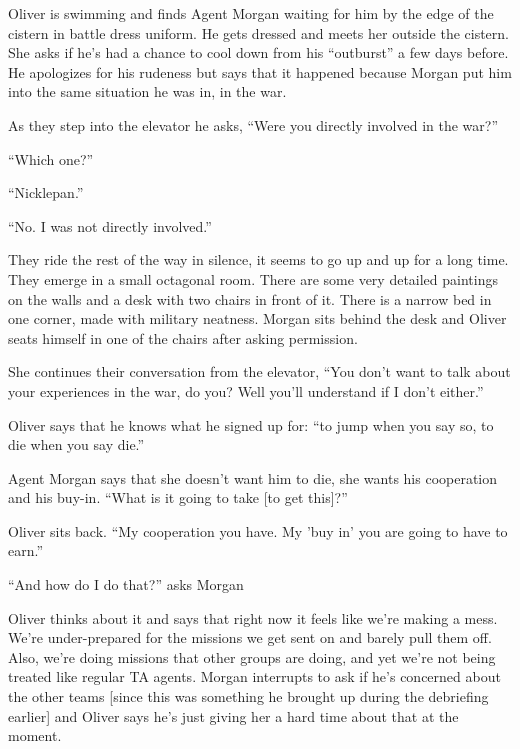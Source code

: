 
Oliver is swimming and finds Agent Morgan waiting for him by the edge of the cistern in battle dress uniform.  He gets dressed and meets her outside the cistern.  She asks if he's had a chance to cool down from his ``outburst'' a few days before.  He apologizes for his rudeness but says that it happened because Morgan put him into the same situation he was in, in the war.  



As they step into the elevator he asks, ``Were you directly involved in the war?'' 

``Which one?''

``Nicklepan.''

``No.  I was not directly involved.''



They ride the rest of the way in silence, it seems to go up and up for a long time.  They emerge in a small octagonal room.  There are some very detailed paintings on the walls and a desk with two chairs in front of it.  There is a narrow bed in one corner, made with military neatness.  Morgan sits behind the desk and Oliver seats himself in one of the chairs after asking permission.



She continues their conversation from the elevator, ``You don't want to talk about your experiences in the war, do you?  Well you'll understand if I don't either.''



Oliver says that he knows what he signed up for: ``to jump when you say so, to die when you say die.''



Agent Morgan says that she doesn't want him to die, she wants his cooperation and his buy-in.  ``What is it going to take {[}to get this{]}?''



Oliver sits back.  ``My cooperation you have.  My 'buy in' you are going to have to earn.''

``And how do I do that?'' asks Morgan



Oliver thinks about it and says that right now it feels like we're making a mess.  We're under-prepared for the missions we get sent on and barely pull them off.  Also, we're doing missions that other groups are doing, and yet we're not being treated like regular TA agents.  Morgan interrupts to ask if he's concerned about the other teams {[}since this was something he brought up during the debriefing earlier{]} and Oliver says he's just giving her a hard time about that at the moment.



